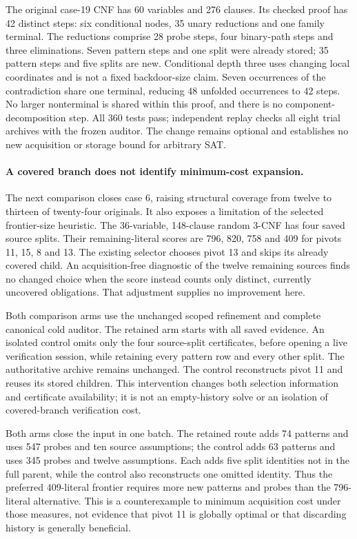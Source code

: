 \documentclass[11pt,a4paper]{article}
\numberwithin{equation}{section}
\theoremstyle{plain}
\theoremstyle{definition}
\theoremstyle{remark}
\begin{document}
The original case-19 CNF has 60 variables and 276 clauses. Its checked proof has
42 distinct steps: six conditional nodes, 35 unary reductions and one family
terminal. The reductions comprise 28 probe steps, four binary-path steps and
three eliminations. Seven pattern steps and one split were already stored; 35
pattern steps and five splits are new. Conditional depth three uses changing
local coordinates and is not a fixed backdoor-size claim. Seven occurrences of
the contradiction share one terminal, reducing 48 unfolded occurrences to 42
steps. No larger nonterminal is shared within this proof, and there is no
component-decomposition step. All 360 tests pass; independent replay checks all
eight trial archives with the frozen auditor. The change remains optional and
establishes no new acquisition or storage bound for arbitrary SAT.

\paragraph{A covered branch does not identify minimum-cost expansion.}
The next comparison closes case 6, raising structural coverage from twelve to
thirteen of twenty-four originals. It also exposes a limitation of the selected
frontier-size heuristic. The 36-variable, 148-clause random 3-CNF has four saved
source splits. Their remaining-literal scores are 796, 820, 758 and 409 for
pivots 11, 15, 8 and 13. The existing selector chooses pivot 13 and skips its
already covered child. An acquisition-free diagnostic of the twelve remaining
sources finds no changed choice when the score instead counts only distinct,
currently uncovered obligations. That adjustment supplies no improvement here.

Both comparison arms use the unchanged scoped refinement and complete canonical
cold auditor. The retained arm starts with all saved evidence. An isolated
control omits only the four source-split certificates, before opening a live
verification session, while retaining every pattern row and every other split.
The authoritative archive remains unchanged. The control reconstructs pivot 11
and reuses its stored children. This intervention changes both selection
information and certificate availability; it is not an empty-history solve or
an isolation of covered-branch verification cost.

Both arms close the input in one batch. The retained route adds 74 patterns and
uses 547 probes and ten source assumptions; the control adds 63 patterns and
uses 345 probes and twelve assumptions. Each adds five split identities not in
the full parent, while the control also reconstructs one omitted identity.
Thus the preferred 409-literal frontier requires more new patterns and probes
than the 796-literal alternative. This is a counterexample to minimum acquisition
cost under those measures, not evidence that pivot 11 is globally optimal or
that discarding history is generally beneficial.
\end{document}
